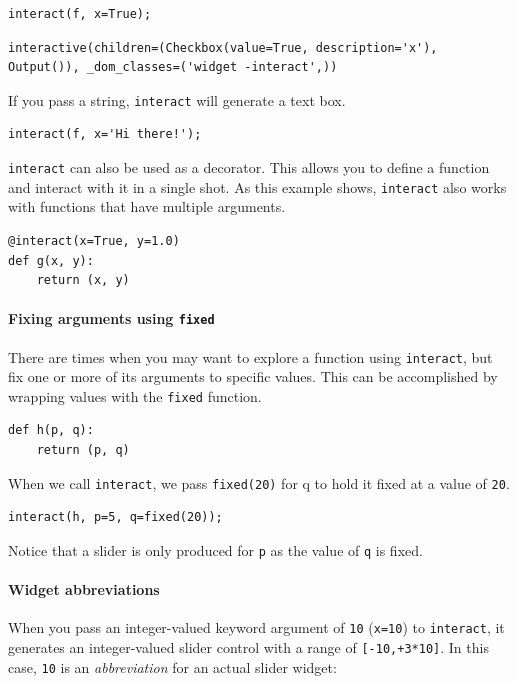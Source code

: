 \begin{verbatim}
interact(f, x=True);
\end{verbatim}

\begin{verbatim}
interactive(children=(Checkbox(value=True, description='x'), Output()), _dom_classes=('widget -interact',))
\end{verbatim}

If you pass a string, \texttt{interact} will generate a text box.

\begin{verbatim}
interact(f, x='Hi there!');
\end{verbatim}

\texttt{interact} can also be used as a decorator. This allows you to define a function and interact with it in a single shot. As this example shows, \texttt{interact} also works with functions that have multiple arguments.

\begin{verbatim}
@interact(x=True, y=1.0)
def g(x, y):
    return (x, y)
\end{verbatim}

\paragraph{Fixing arguments using \texttt{fixed}}

There are times when you may want to explore a function using \texttt{interact}, but fix one or more of its arguments to specific values. This can be accomplished by wrapping values with the \texttt{fixed} function.

\begin{verbatim}
def h(p, q):
    return (p, q)
\end{verbatim}

When we call \texttt{interact}, we pass \texttt{fixed(20)} for q to hold it fixed at a value of \texttt{20}.

\begin{verbatim}
interact(h, p=5, q=fixed(20));
\end{verbatim}

Notice that a slider is only produced for \texttt{p} as the value of \texttt{q} is fixed.

\paragraph{Widget abbreviations}

When you pass an integer-valued keyword argument of \texttt{10} (\texttt{x=10}) to \texttt{interact}, it generates an integer-valued slider control with a range of \texttt{[-10,+3*10]}. In this case, \texttt{10} is an \textit{abbreviation} for an actual slider widget:

